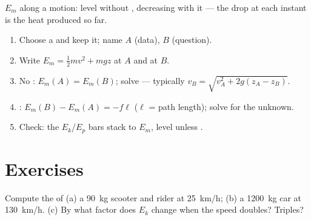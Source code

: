 \begin{omfigure}

{\small $E_m$ along a motion: level without , decreasing with
it --- the drop at each instant is the heat produced so far.}
\end{omfigure}

\begin{method}\label{met:g11:mechanical-energy:bookkeeping}
\begin{enumerate}
  \item Choose a  and keep it; name $A$ (data), $B$
        (question).
  \item Write $E_m = \tfrac12 mv^2 + mgz$ at $A$ and at $B$.
  \item No : $E_m(A) = E_m(B)$; solve --- typically
        $v_B = \sqrt{v_A^2 + 2g(z_A - z_B)}$.
  \item {}: $E_m(B) - E_m(A) = -f\ell$ ($\ell$ = path length);
        solve for the unknown.
  \item Check: the $E_k$/$E_p$ bars stack to $E_m$, level unless .
\end{enumerate}
\end{method}

\section{Exercises}

\begin{exercise}[$\star$]\label{exo:g11:mechanical-energy:1}
Compute the  of (a) a \qty{90}{kg} scooter and rider at
\qty{25}{km/h}; (b) a \qty{1200}{kg} car at \qty{130}{km/h}. (c) By what
factor does $E_k$ change when the speed doubles? Triples?
\end{exercise}

